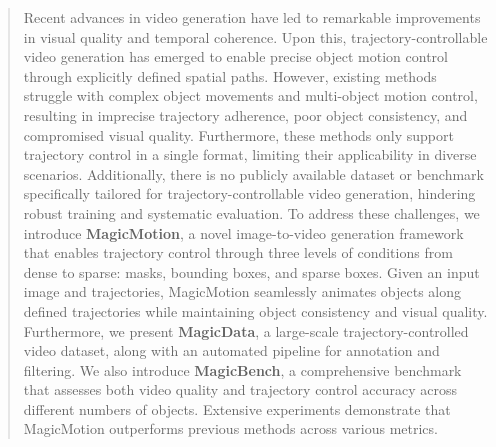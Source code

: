 \begin{abstract}
Recent advances in video generation have led to remarkable improvements in visual quality and temporal coherence. Upon this, trajectory-controllable video generation has emerged to enable precise object motion control through explicitly defined spatial paths.
However, existing methods struggle with complex object movements and multi-object motion control, resulting in imprecise trajectory adherence, poor object consistency, and compromised visual quality.
Furthermore, these methods only support trajectory control in a single format, limiting their applicability in diverse scenarios.
Additionally, there is no publicly available dataset or benchmark specifically tailored for trajectory-controllable video generation, hindering robust training and systematic evaluation.
To address these challenges, we introduce \textbf{MagicMotion}, a novel image-to-video generation framework that enables trajectory control through three levels of conditions from dense to sparse: masks, bounding boxes, and sparse boxes. Given an input image and trajectories, MagicMotion seamlessly animates objects along defined trajectories while maintaining object consistency and visual quality.
Furthermore, we present \textbf{MagicData}, a large-scale trajectory-controlled video dataset, along with an automated pipeline for annotation and filtering. 
We also introduce \textbf{MagicBench}, a comprehensive benchmark that assesses both video quality and trajectory control accuracy across different numbers of objects.
Extensive experiments demonstrate that MagicMotion outperforms previous methods across various metrics.
\end{abstract}
\vspace{-0.2cm}
